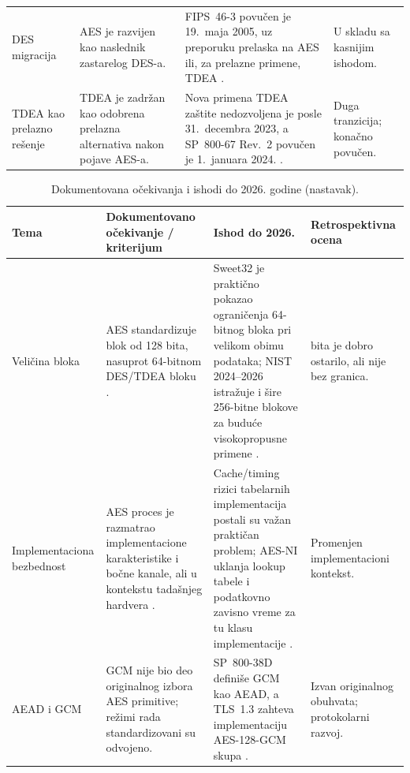 \begin{table}[htbp]
\begin{tabular}{@{}>{\raggedright\arraybackslash}p{} >{\raggedright\arraybackslash}p{} >{\raggedright\arraybackslash}p{} >{\raggedright\arraybackslash}p{}@{}}
\addlinespace
DES migracija &
AES je razvijen kao naslednik zastarelog DES-a. &
FIPS~46-3 povučen je 19.\ maja 2005, uz preporuku prelaska na AES ili,
za prelazne primene, TDEA \cite{federalregister2005des}. &
U skladu sa kasnijim ishodom. \\

\addlinespace
TDEA kao prelazno rešenje &
TDEA je zadržan kao odobrena prelazna alternativa nakon pojave AES-a. &
Nova primena TDEA zaštite nedozvoljena je posle 31.\ decembra 2023, a
SP~800-67 Rev.~2 povučen je 1.\ januara 2024.
\cite{nist_sp800131ar2,nist_tdea_withdrawal_2023}. &
Duga tranzicija; konačno povučen. \\
\bottomrule
\end{tabular}
\end{table}

\begin{table}[htbp]
\centering
\small
\setlength{\tabcolsep}{4pt}
\ContinuedFloat
\caption[]{Dokumentovana očekivanja i ishodi do 2026. godine (nastavak).}
\begin{tabular}{@{}>{\raggedright\arraybackslash}p{} >{\raggedright\arraybackslash}p{} >{\raggedright\arraybackslash}p{} >{\raggedright\arraybackslash}p{}@{}}
\toprule
Tema &
Dokumentovano očekivanje / kriterijum &
Ishod do 2026. &
Retrospektivna ocena \\
\midrule
Veličina bloka &
AES standardizuje blok od 128 bita, nasuprot 64-bitnom DES/TDEA bloku
\cite{nist_fips197_2001}. &
Sweet32 je praktično pokazao ograničenja 64-bitnog bloka pri velikom
obimu podataka; NIST 2024--2026 istražuje i šire 256-bitne blokove za
buduće visokopropusne primene
\cite{bhargavan2016sweet32,nist_sp800197_predraft,nist_wgcm_2026}. &
128 bita je dobro ostarilo, ali nije bez granica. \\

\addlinespace
Implementa\-ciona bezbednost &
AES proces je razmatrao implementacione karakteristike i bočne kanale,
ali u kontekstu tadašnjeg hardvera \cite{nechvatal2001aes}. &
Cache/timing rizici tabelarnih implementacija postali su važan praktičan
problem; AES-NI uklanja lookup tabele i podatkovno zavisno vreme za tu
klasu implementacije \cite{gueron2012aesni}. &
Promenjen implementacioni kontekst. \\

\addlinespace
AEAD i GCM &
GCM nije bio deo originalnog izbora AES primitive; režimi rada
standardizovani su odvojeno. &
SP~800-38D definiše GCM kao AEAD, a TLS~1.3 zahteva implementaciju
AES-128-GCM skupa \cite{nist_sp80038d,rfc8446}. &
Izvan originalnog obuhvata; protokolarni razvoj. \\


\end{tabular}
\end{table}
